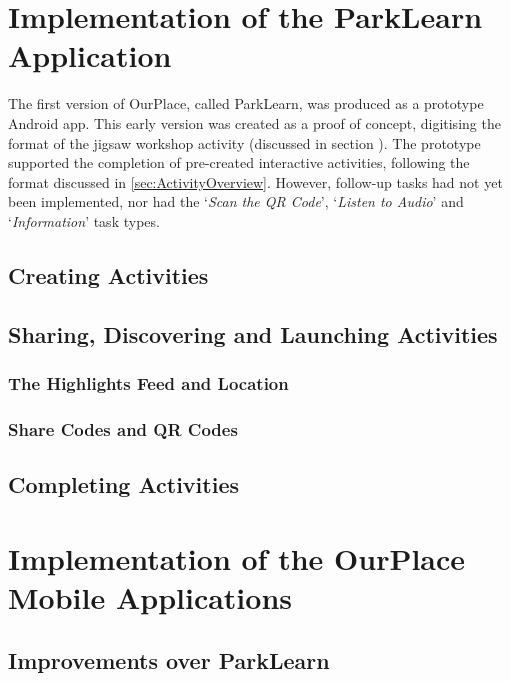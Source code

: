 \section{Implementation of the ParkLearn Application}
\label{sec:ImplementationParkLearn}

The first version of OurPlace, called ParkLearn, was produced as a prototype
Android app. This early version was created as a proof of concept, digitising
the format of the jigsaw workshop activity (discussed in section
). The prototype
supported the completion of pre-created interactive activities, following the
format discussed in \ref{sec:ActivityOverview}. However, follow-up tasks had not
yet been implemented, nor had the `\textit{Scan the QR Code}', `\textit{Listen to
Audio}' and `\textit{Information}' task types.

\subsection{Creating Activities}

\subsection{Sharing, Discovering and Launching Activities}

\subsubsection{The Highlights Feed and Location}

\subsubsection{Share Codes and QR Codes}

\subsection{Completing Activities}

\section{Implementation of the OurPlace Mobile Applications}
\label{sec:ImplementationMobile}

\subsection{Improvements over ParkLearn}

